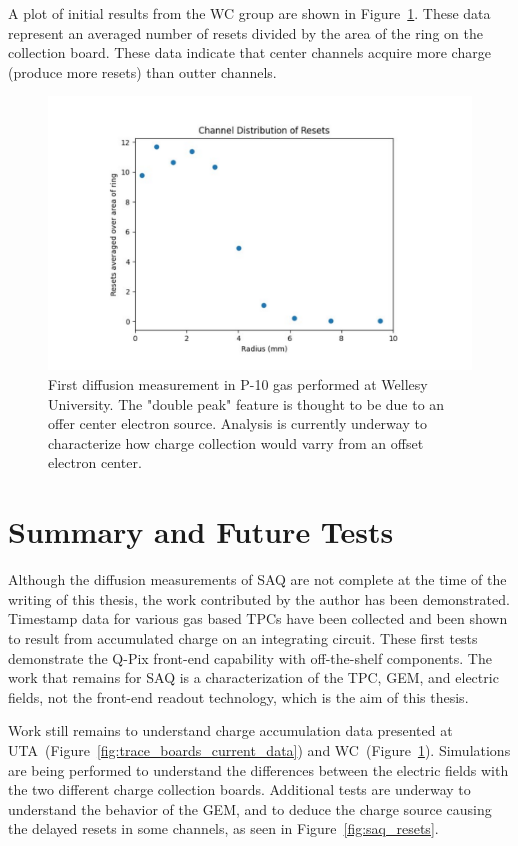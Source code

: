 A plot of initial results from the WC group are shown in Figure~\ref{fig:saq_first_diffusion_measurement}.
These data represent an averaged number of resets divided by the area of the ring on the collection board.
These data indicate that center channels acquire more charge (produce more resets) than outter channels.

\begin{figure}[]
\centering
\includegraphics[width=\textwidth]{images/SAQ_first_diffusion_measurement.pdf}
\caption{First diffusion measurement in P-10 gas performed at Wellesy University.
The "double peak" feature is thought to be due to an offer center electron source.
Analysis is currently underway to characterize how charge collection would varry from an offset electron center.
}
\label{fig:saq_first_diffusion_measurement}
\end{figure}


\section{Summary and Future Tests}

Although the diffusion measurements of SAQ are not complete at the time of the writing of this thesis, the work contributed by the author has been demonstrated.
Timestamp data for various gas based TPCs have been collected and been shown to result from accumulated charge on an integrating circuit.
These first tests demonstrate the Q-Pix front-end capability with off-the-shelf components.
The work that remains for SAQ is a characterization of the TPC, GEM, and electric fields, not the front-end readout technology, which is the aim of this thesis.


Work still remains to understand charge accumulation data presented at UTA~(Figure~\ref{fig:trace_boards_current_data}) and WC~(Figure~\ref{fig:saq_first_diffusion_measurement}).
Simulations are being performed to understand the differences between the electric fields with the two different charge collection boards.
Additional tests are underway to understand the behavior of the GEM, and to deduce the charge source causing the delayed resets in some channels, as seen in Figure~\ref{fig:saq_resets}.

